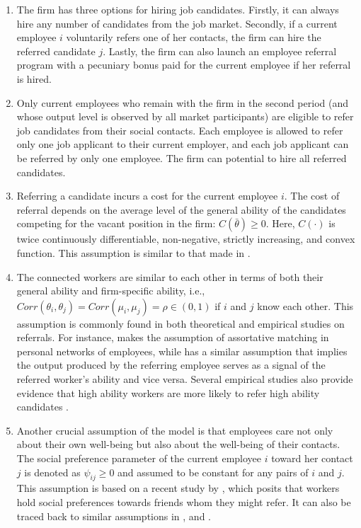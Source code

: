\documentclass[12pt]{article}
\begin{document}
\begin{enumerate}[label={A}{\arabic*}., resume]
    \item The firm has three options for hiring job candidates. Firstly, it can always hire any number of candidates from the job market. Secondly, if a current employee $i$ voluntarily refers one of her contacts, the firm can hire the referred candidate $j$. Lastly, the firm can also launch an employee referral program with a pecuniary bonus paid for the current employee if her referral is hired.
    \item Only current employees who remain with the firm in the second period (and whose output level is observed by all market participants) are eligible to refer job candidates from their social contacts. Each employee is allowed to refer only one job applicant to their current employer, and each job applicant can be referred by only one employee. The firm can potential to hire all referred candidates.
    \item Referring a candidate incurs a cost for the current employee $i$. The cost of referral depends on the average level of the general ability of the candidates competing for the vacant position in the firm: $C(\bar{\theta}) \geq 0$. Here, $C(\cdot)$ is twice continuously differentiable, non-negative, strictly increasing, and convex function. This assumption is similar to that made in \cite{ekinci2016employee}.
    \item The connected workers are similar to each other in terms of both their general ability and firm-specific ability, i.e., $Corr(\theta_{i},\theta_{j}) = Corr(\mu_{i},\mu_{j})= \rho \in (0,1)$ if $i$ and $j$ know each other. This assumption is commonly found in both theoretical and empirical studies on referrals. For instance, \cite{montgomery1991social} makes the assumption of assortative matching in personal networks of employees, while \cite{ekinci2016employee} has a similar assumption that implies the output produced by the referring employee serves as a signal of the referred worker’s ability and vice versa. Several empirical studies also provide evidence that high ability workers are more likely to refer high ability candidates \citep{lalanne2021social, beaman2012gets, burks2015value}.
    \item Another crucial assumption of the model is that employees care not only about their own well-being but also about the well-being of their contacts. The social preference parameter of the current employee $i$ toward her contact $j$ is denoted as $\psi_{ij} \geq 0$ and assumed to be constant for any pairs of $i$ and $j$. This assumption is based on a recent study by \cite{friebel2023employee}, which posits that workers hold social preferences towards friends whom they might refer. It can also be traced back to similar assumptions in \cite{bandiera2005social}, \cite{bandiera2009social} and \cite{beaman2012gets}.
\end{enumerate}
\end{document}
